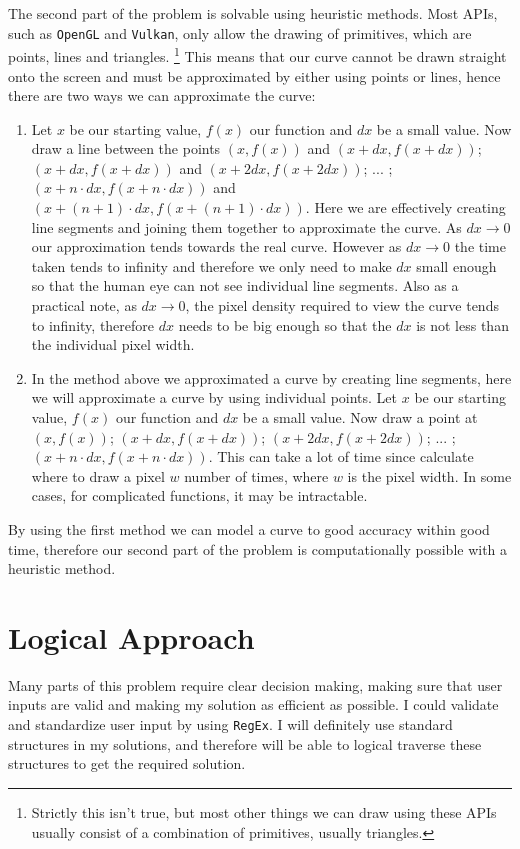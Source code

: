 \documentclass[../../../main.tex]{subfiles}
\begin{document}
The second part of the problem is solvable using heuristic methods. Most APIs, such as \texttt{OpenGL\cite{opengl}} and \texttt{Vulkan}, only allow the drawing of primitives, which are points, lines and triangles.
\footnote{Strictly this isn't true, but most other things we can draw using these APIs usually consist of a combination of primitives, usually triangles.} This means that our curve cannot be drawn straight onto the screen and must be approximated by either using points or lines, hence there are two ways we can approximate the curve:
\begin{enumerate}
\item Let $x$ be our starting value, $f(x)$ our function and $dx$ be a small value. Now draw a line between the points $(x,f(x))$ and $(x+dx,f(x+dx))$; $(x+dx,f(x+dx))$ and $(x+2dx,f(x+2dx))$; ... ;$(x+n\cdot dx,f(x+n\cdot dx))$ and $(x+(n+1)\cdot dx,f(x+(n+1)\cdot dx))$. Here we are effectively creating line segments and joining them together to approximate the curve. As $dx\to0$ our approximation tends towards the real curve. However as $dx\to0$ the time taken tends to infinity and therefore we only need to make $dx$ small enough so that the human eye can not see individual line segments. Also as a practical note, as $dx\to0$, the pixel density required to view the curve tends to infinity, therefore $dx$ needs to be big enough so that the $dx$ is not less than the individual pixel width.
\item In the method above we approximated a curve by creating line segments, here we will approximate a curve by using individual points. Let $x$ be our starting value, $f(x)$ our function and $dx$ be a small value. Now draw a point at $(x,f(x))$; $(x+dx,f(x+dx))$; $(x+2dx,f(x+2dx))$; ... ;$(x+n\cdot dx,f(x+n\cdot dx))$. This can take a lot of time since calculate where to draw a pixel $w$ number of times, where $w$ is the pixel width. In some cases, for complicated functions, it may be intractable.
\end{enumerate}
By using the first method we can model a curve to good accuracy within good time, therefore our second part of the problem is computationally possible with a heuristic method.
\newpage
\section{Logical Approach}
Many parts of this problem require clear decision making, making sure that user inputs are valid and making my solution as efficient as possible. I could validate and standardize user input by using \texttt{RegEx\cite{regex}}. I will definitely use standard structures in my solutions, and therefore will be able to logical traverse these structures to get the required solution.
\end{document}
